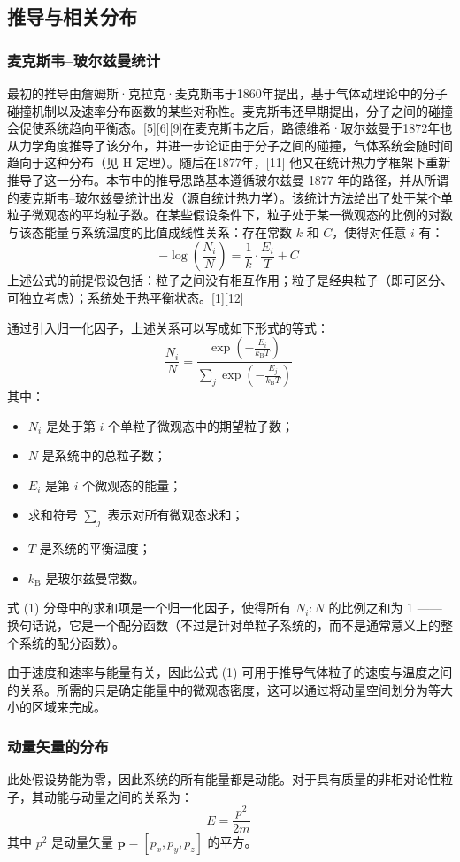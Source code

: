 \subsection{推导与相关分布}
\subsubsection{麦克斯韦–玻尔兹曼统计}
最初的推导由詹姆斯·克拉克·麦克斯韦于1860年提出，基于气体动理论中的分子碰撞机制以及速率分布函数的某些对称性。麦克斯韦还早期提出，分子之间的碰撞会促使系统趋向平衡态。[5][6][9]在麦克斯韦之后，路德维希·玻尔兹曼于1872年也从力学角度推导了该分布，并进一步论证由于分子之间的碰撞，气体系统会随时间趋向于这种分布（见 H 定理）。随后在1877年，[11] 他又在统计热力学框架下重新推导了这一分布。本节中的推导思路基本遵循玻尔兹曼 1877 年的路径，并从所谓的麦克斯韦–玻尔兹曼统计出发（源自统计热力学）。该统计方法给出了处于某个单粒子微观态的平均粒子数。在某些假设条件下，粒子处于某一微观态的比例的对数与该态能量与系统温度的比值成线性关系：存在常数 $k$ 和 $C$，使得对任意 $i$ 有：
$$
-\log\left(\frac{N_i}{N}\right) = \frac{1}{k} \cdot \frac{E_i}{T} + C~
$$
上述公式的前提假设包括：粒子之间没有相互作用；粒子是经典粒子（即可区分、可独立考虑）；系统处于热平衡状态。[1][12]

通过引入归一化因子，上述关系可以写成如下形式的等式：
$$
\frac{N_i}{N} = \frac{\exp\left( -\frac{E_i}{k_{\text{B}} T} \right)}{\sum\limits_j \exp\left( -\frac{E_j}{k_{\text{B}} T} \right)} \tag{1}~
$$
其中：
\begin{itemize}
\item $N_i$ 是处于第 $i$ 个单粒子微观态中的期望粒子数；
\item $N$ 是系统中的总粒子数；
\item $E_i$ 是第 $i$ 个微观态的能量；
\item 求和符号 $\sum_j$ 表示对所有微观态求和；
\item $T$ 是系统的平衡温度；
\item $k_{\text{B}}$ 是玻尔兹曼常数。
\end{itemize}
式 (1) 分母中的求和项是一个归一化因子，使得所有 $N_i : N$ 的比例之和为 1 —— 换句话说，它是一个配分函数（不过是针对单粒子系统的，而不是通常意义上的整个系统的配分函数）。

由于速度和速率与能量有关，因此公式 (1) 可用于推导气体粒子的速度与温度之间的关系。所需的只是确定能量中的微观态密度，这可以通过将动量空间划分为等大小的区域来完成。
\subsubsection{动量矢量的分布}
此处假设势能为零，因此系统的所有能量都是动能。对于具有质量的非相对论性粒子，其动能与动量之间的关系为：
$$
E = \frac{p^2}{2m} \tag{2}~
$$
其中 $p^2$ 是动量矢量 $\mathbf{p} = [p_x, p_y, p_z]$ 的平方。

